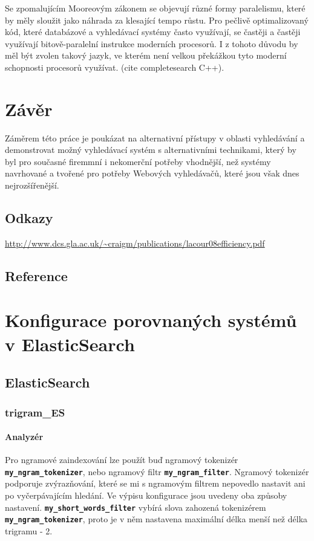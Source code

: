 \documentclass[11pt,letterpaper,oneside,openright]{book}
\newcommand{\bftt}[1]{\texttt{\textbf{#1}}}
\begin{document}
Se zpomalujícím Mooreovým zákonem se objevují různé formy paralelismu, které by
měly sloužit jako náhrada za klesající tempo růstu. Pro pečlivě optimalizovaný
kód, které databázové a vyhledávací systémy často využívají, se častěji a
častěji využívají bitově-paralelní instrukce moderních procesorů. I z tohoto
důvodu by měl být zvolen takový jazyk, ve kterém není velkou překážkou tyto
moderní schopnosti procesorů využívat. (cite completesearch C++).


\chapter{Závěr}
Záměrem této práce je poukázat na alternativní přístupy v oblasti vyhledávání a
demonstrovat možný vyhledávací systém s alternativními technikami, který by byl
pro současné firemmní i nekomerční potřeby vhodnější, než systémy navrhované a
tvořené pro potřeby Webových vyhledávačů, které jsou však dnes nejrozšířenější.

\section*{Odkazy}
\url{http://www.dcs.gla.ac.uk/~craigm/publications/lacour08efficiency.pdf}

\newpage
\section*{Reference}



\appendix
\chapter{Konfigurace porovnaných systémů v ElasticSearch}\label{appendix:search_config}
\section{ElasticSearch}
\subsection{trigram\_ES}
\subsubsection{Analyzér}
Pro ngramové zaindexování lze použít buď ngramový tokenizér
\bftt{my\_ngram\_tokenizer}, nebo ngramový filtr \bftt{my\_ngram\_filter}.
Ngramový tokenizér podporuje zvýrazňování, které se mi s ngramovým filtrem
nepovedlo nastavit ani po vyčerpávajícím hledání. Ve výpisu konfigurace jsou
uvedeny oba způsoby nastavení. \bftt{my\_short\_words\_filter} vybírá slova
zahozená tokenizérem \bftt{my\_ngram\_tokenizer}, proto je v něm nastavena
maximální délka menší než délka trigramu - 2.
\end{document}
